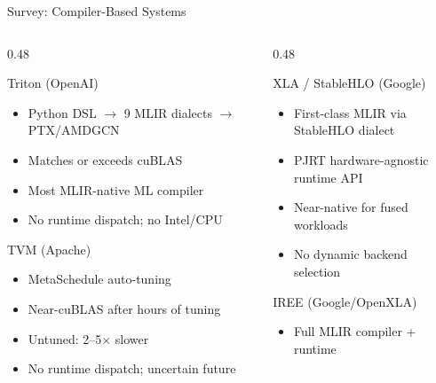 \documentclass[aspectratio=169,10pt]{beamer}
\begin{document}
\begin{frame}{Survey: Compiler-Based Systems}
  \begin{columns}[T]
    \begin{column}{0.48\textwidth}
      \begin{block}{Triton (OpenAI)}
        \begin{itemize}
          \item Python DSL $\to$ 9 MLIR dialects $\to$ PTX/AMDGCN
          \item Matches or exceeds cuBLAS
          \item Most MLIR-native ML compiler
          \item \textcolor{codered}{No runtime dispatch; no Intel/CPU}
        \end{itemize}
      \end{block}
      \begin{block}{TVM (Apache)}
        \begin{itemize}
          \item MetaSchedule auto-tuning
          \item Near-cuBLAS after hours of tuning
          \item Untuned: 2--5$\times$ slower
          \item \textcolor{codered}{No runtime dispatch; uncertain future}
        \end{itemize}
      \end{block}
    \end{column}
    \begin{column}{0.48\textwidth}
      \begin{block}{XLA / StableHLO (Google)}
        \begin{itemize}
          \item First-class MLIR via StableHLO dialect
          \item PJRT hardware-agnostic runtime API
          \item Near-native for fused workloads
          \item \textcolor{codered}{No dynamic backend selection}
        \end{itemize}
      \end{block}
      \begin{block}{IREE (Google/OpenXLA)}
        \begin{itemize}
          \item Full MLIR compiler + runtime

\end{itemize}
\end{block}
\end{column}
\end{columns}
\end{frame}
\end{document}

